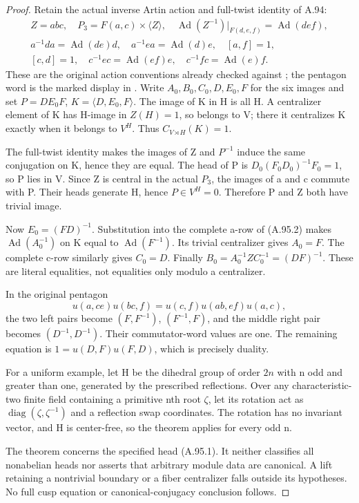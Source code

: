 \begin{proof}
Retain the actual inverse Artin action and full-twist identity of A.94:
\[
\begin{gathered}
 Z=abc,\quad P_3=F(a,c)\times\langle Z\rangle,
 \quad \operatorname{Ad}(Z^{-1})|_{F(d,e,f)}=\operatorname{Ad}(def),\\
 a^{-1}da=\operatorname{Ad}(de)d,\quad
 a^{-1}ea=\operatorname{Ad}(d)e,\quad [a,f]=1,\\
 [c,d]=1,\quad c^{-1}ec=\operatorname{Ad}(ef)e,
 \quad c^{-1}fc=\operatorname{Ad}(e)f.
\end{gathered}
\tag{A.95.2}
\]
These are the original action conventions already checked against
\citet[Example~1.1, pp.~465--466]{CECohen2010}; the pentagon word is
the marked display in \citet[p.~547, Eq.~(4)]{Furusho2010}.
Write \(A_0,B_0,C_0,D,E_0,F\) for the six images and set
\(P=DE_0F\), \(K=\langle D,E_0,F\rangle\). The image of K in H
is all H. A centralizer element of K has H-image in \(Z(H)=1\),
so belongs to V; there it centralizes K exactly when it belongs to
\(V^H\). Thus \(C_{V\rtimes H}(K)=1\).

The full-twist identity makes the images of Z and \(P^{-1}\) induce
the same conjugation on K, hence they are equal. The head of P is
\(D_0(F_0D_0)^{-1}F_0=1\), so P lies in V. Since Z is central
in the actual \(P_3\), the images of a and c commute with P.
Their heads generate H, hence \(P\in V^H=0\). Therefore P and Z
both have trivial image.

Now \(E_0=(FD)^{-1}\). Substitution into the complete a-row of
(A.95.2) makes \(\operatorname{Ad}(A_0^{-1})\) on K equal to
\(\operatorname{Ad}(F^{-1})\). Its trivial centralizer gives
\(A_0=F\). The complete c-row similarly gives \(C_0=D\).
Finally \(B_0=A_0^{-1}ZC_0^{-1}=(DF)^{-1}\). These are literal
equalities, not equalities only modulo a centralizer.

In the original pentagon
\[
 u(a,ce)u(bc,f)=u(c,f)u(ab,ef)u(a,c),
 \tag{A.95.3}
\]
the two left pairs become \((F,F^{-1})\), \((F^{-1},F)\),
and the middle right pair becomes \((D^{-1},D^{-1})\).
Their commutator-word values are one. The remaining equation is
\(1=u(D,F)u(F,D)\), which is precisely duality.

For a uniform example, let H be the dihedral group of order \(2n\)
with n odd and greater than one, generated by the prescribed
reflections. Over any characteristic-two finite field containing a
primitive nth root \(\zeta\), let its rotation act as
\(\operatorname{diag}(\zeta,\zeta^{-1})\) and a reflection swap
coordinates. The rotation has no invariant vector, and H is
center-free, so the theorem applies for every odd n.

The theorem concerns the specified head (A.95.1). It neither classifies
all nonabelian heads nor asserts that arbitrary module data are
canonical. A lift retaining a nontrivial boundary or a fiber
centralizer falls outside its hypotheses. No full cusp equation or
canonical-conjugacy conclusion follows.
\end{proof}
